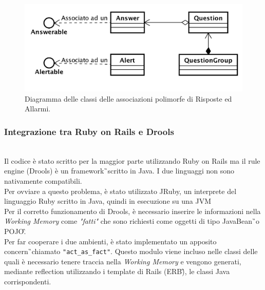 \begin{figure}[H]
	\begin{center}
		\includegraphics[width=14cm]{Pics/diagramma_classi_associazioni_polimorfe.png}
		\caption{Diagramma delle classi delle associazioni polimorfe di Risposte ed Allarmi.}
		\label{fig:DiagrammaClassiAssociazioniPolimorfe}
	\end{center}
\end{figure}

\subsubsection{Integrazione tra Ruby on Rails e Drools}\mbox{} \\

Il codice è stato scritto per la maggior parte utilizzando Ruby on Rails ma il rule engine (Drools) è un \gls{framework}\G\ scritto in Java. I due linguaggi non sono nativamente compatibili. \\
Per ovviare a questo problema, è stato utilizzato JRuby, un interprete del linguaggio Ruby scritto in Java, quindi in esecuzione su una \gls{JVM}\G\. \\
Per il corretto funzionamento di Drools, è necessario inserire le informazioni nella \textit{Working Memory} come \textit{"fatti"} che sono richiesti come oggetti di tipo \gls{JavaBean}\G\ o \gls{POJO}\G.\\
Per far cooperare i due ambienti, è stato implementato un apposito \gls{concern}\G\ chiamato \texttt{"act\_as\_fact"}. Questo modulo viene incluso nelle classi delle quali è necessario tenere traccia nella \textit{Working Memory} e vengono generati, mediante \gls{reflection} utilizzando i template di Rails (\gls{ERB}\G), le classi Java corrispondenti.








